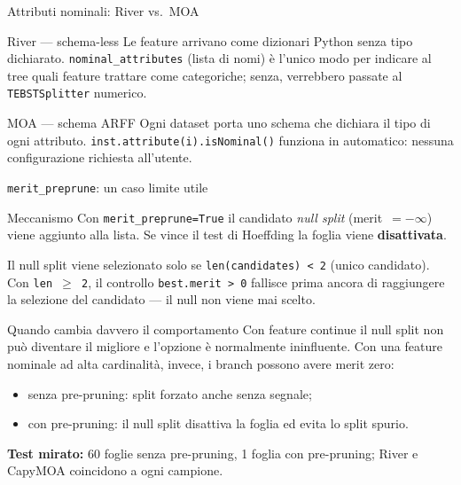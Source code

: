\documentclass[aspectratio=169,10pt]{beamer}
\begin{document}
\begin{frame}{Attributi nominali: River vs.\ MOA}
  \begin{block}{River — schema-less}
    \small
    Le feature arrivano come dizionari Python senza tipo dichiarato.
    \texttt{nominal\_attributes} (lista di nomi) è l'unico modo per
    indicare al tree quali feature trattare come categoriche; senza,
    verrebbero passate al \texttt{TEBSTSplitter} numerico.
  \end{block}

  \medskip

  \begin{block}{MOA — schema ARFF}
    \small
    Ogni dataset porta uno schema che dichiara il tipo di ogni attributo.
    \texttt{inst.attribute(i).isNominal()} funziona in automatico:
    nessuna configurazione richiesta all'utente.
  \end{block}
\end{frame}

\begin{frame}{\texttt{merit\_preprune}: un caso limite utile}

  \begin{block}{Meccanismo}
    \small
    Con \texttt{merit\_preprune=True} il candidato \emph{null split}
    (merit~$= -\infty$) viene aggiunto alla lista.
    Se vince il test di Hoeffding la foglia viene \textbf{disattivata}.

    \smallskip
    Il null split viene selezionato solo se \texttt{len(candidates)~<~2}
    (unico candidato). Con \texttt{len~$\ge$~2}, il controllo
    \texttt{best.merit~>~0} fallisce prima ancora di raggiungere
    la selezione del candidato — il null non viene mai scelto.
  \end{block}

  \medskip
  \begin{alertblock}{Quando cambia davvero il comportamento}
    \small
    Con feature continue il null split non può diventare il migliore e
    l'opzione è normalmente ininfluente. Con una feature nominale ad alta
    cardinalità, invece, i branch possono avere merit zero:
    \begin{itemize}
      \item senza pre-pruning: split forzato anche senza segnale;
      \item con pre-pruning: il null split disattiva la foglia ed evita
            lo split spurio.
    \end{itemize}
    \textbf{Test mirato:} 60 foglie senza pre-pruning, 1 foglia con pre-pruning;
    River e CapyMOA coincidono a ogni campione.
  \end{alertblock}
\end{frame}
\end{document}
